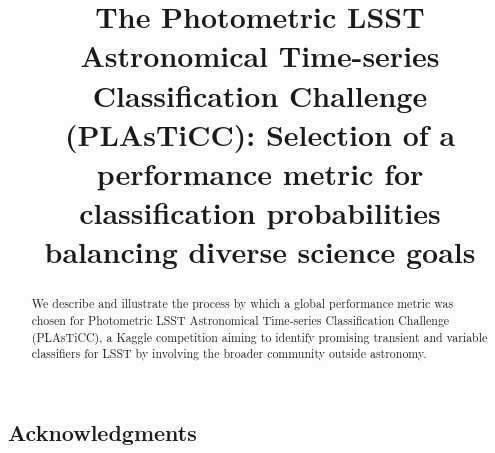 \documentclass[\docopts]{\docclass}
\begin{document}
\title{The Photometric LSST Astronomical Time-series Classification Challenge (PLAsTiCC): Selection of a performance metric for classification probabilities balancing diverse science goals}

\maketitlepre

\begin{abstract}

  We describe and illustrate the process by which a global performance metric was chosen for Photometric LSST Astronomical Time-series Classification Challenge (PLAsTiCC), a Kaggle competition aiming to identify promising transient and variable classifiers for LSST by involving the broader community outside astronomy.

\end{abstract}

\dockeys{}

\maketitlepost















\subsection*{Acknowledgments}



\end{document}
